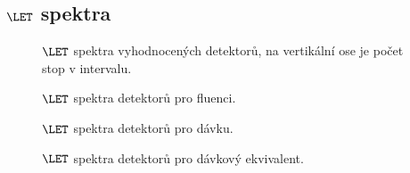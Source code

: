 \begin{appendices}
\chapter{$\LET$ spektra}
\begin{figure}[h]
  \centering
	\centering
	
	\caption{$\LET$ spektra vyhodnocených detektorů, na vertikální ose je počet stop v intervalu.}
	\label{fig:praktickaCast_LETcetnost}
\end{figure}
\begin{figure}[h]
  \centering
	\centering
	
	\caption{$\LET$ spektra detektorů pro fluenci.}
	\label{fig:praktickaCast_LETfluence}
\end{figure}
\begin{figure}[h]
  \centering
	\centering
	
	\caption{$\LET$ spektra detektorů pro dávku.}
	\label{fig:praktickaCast_LETdavka}
\end{figure}
\begin{figure}[h]
  \centering
	\centering
	
	\caption{$\LET$ spektra detektorů pro dávkový ekvivalent.}
	\label{fig:praktickaCast_LETdavkEkvivalent}
\end{figure}
\end{appendices}
